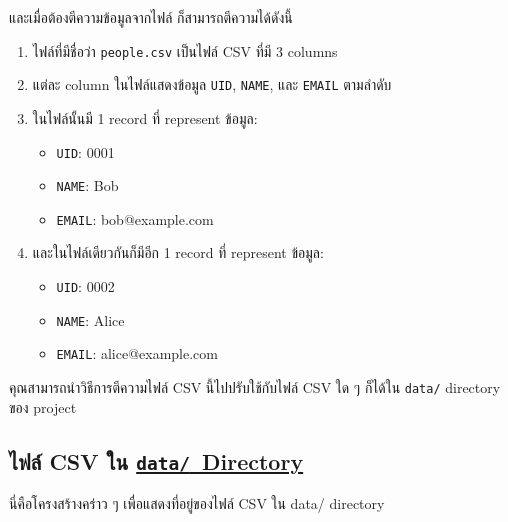 และเมื่อต้องตีความข้อมูลจากไฟล์  ก็สามารถตีความได้ดังนี้

\begin{enumerate}
    \item ไฟล์ที่มีชื่อว่า \texttt{people.csv} เป็นไฟล์ CSV ที่มี 3 columns
    \item แต่ละ column ในไฟล์แสดงข้อมูล \texttt{UID}, \texttt{NAME}, และ \texttt{EMAIL} ตามลำดับ
    \item ในไฟล์นั้นมี 1 record ที่ represent ข้อมูล:
        \begin{itemize}
            \item \texttt{UID}: 0001
            \item \texttt{NAME}: Bob
            \item \texttt{EMAIL}: bob@example.com
        \end{itemize}
    \item และในไฟล์เดียวกันก็มีอีก 1 record ที่ represent ข้อมูล:
        \begin{itemize}
            \item \texttt{UID}: 0002
            \item \texttt{NAME}: Alice
            \item \texttt{EMAIL}: alice@example.com
        \end{itemize}
\end{enumerate}

คุณสามารถนำวิธีการตีความไฟล์ CSV นี้ไปปรับใช้กับไฟล์ CSV ใด ๆ ก็ได้ใน \texttt{data/} directory ของ project

\clearpage

\subsection{ไฟล์ CSV ใน \href{https://github.com/CS211-651/project211-oakcoding/tree/9397d355461933fb007261e2ee97445ea93eacc1/data}{\texttt{data\slash}~Directory}}

นี่คือโครงสร้างคร่าว ๆ เพื่อแสดงที่อยู่ของไฟล์ CSV ใน data/ directory

